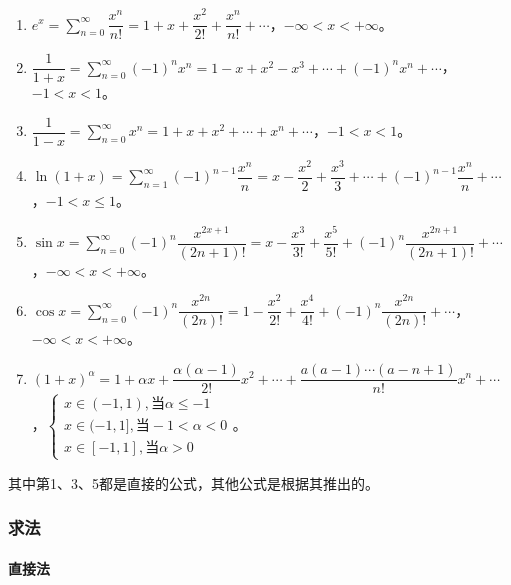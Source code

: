 \documentclass[UTF8, 12pt]{ctexart}
\begin{document}
        \begin{enumerate}
            \item $e^x=\sum\limits_{n=0}^\infty\dfrac{x^n}{n!}=1+x+\dfrac{x^2}{2!}+\dfrac{x^n}{n!}+\cdots$，$-\infty<x<+\infty$。
            \item $\dfrac{1}{1+x}=\sum\limits_{n=0}^\infty(-1)^nx^n=1-x+x^2-x^3+\cdots+(-1)^nx^n+\cdots$，$-1<x<1$。
            \item $\dfrac{1}{1-x}=\sum\limits_{n=0}^\infty x^n=1+x+x^2+\cdots+x^n+\cdots$，$-1<x<1$。
            \item $\ln(1+x)=\sum\limits_{n=1}^\infty(-1)^{n-1}\dfrac{x^n}{n}=x-\dfrac{x^2}{2}+\dfrac{x^3}{3}+\cdots+(-1)^{n-1}\dfrac{x^n}{n}+\cdots$，$-1<x\leqslant1$。
            \item $\sin x=\sum\limits_{n=0}^\infty(-1)^n\dfrac{x^{2x+1}}{(2n+1)!}=x-\dfrac{x^3}{3!}+\dfrac{x^5}{5!}+(-1)^n\dfrac{x^{2n+1}}{(2n+1)!}+\cdots$，$-\infty<x<+\infty$。
            \item $\cos x=\sum\limits_{n=0}^\infty(-1)^n\dfrac{x^{2n}}{(2n)!}=1-\dfrac{x^2}{2!}+\dfrac{x^4}{4!}+(-1)^n\dfrac{x^{2n}}{(2n)!}+\cdots$，$-\infty<x<+\infty$。
            \item $(1+x)^\alpha=1+\alpha x+\dfrac{\alpha(\alpha-1)}{2!}x^2+\cdots+\dfrac{a(a-1)\cdots(a-n+1)}{n!}x^n+\cdots$，$\left\{\begin{array}{l}
                                                                                                                                         x\in(-1,1),\text{当}\alpha\leqslant-1 \\
                                                                                                                                         x\in(-1,1],\text{当}-1<\alpha<0 \\
                                                                                                                                         x\in[-1,1],\text{当}\alpha>0
            \end{array}\right.$。
        \end{enumerate}

        其中第1、3、5都是直接的公式，其他公式是根据其推出的。

        \subsubsection{求法}

        \paragraph{直接法} \leavevmode \medskip
\end{document}
